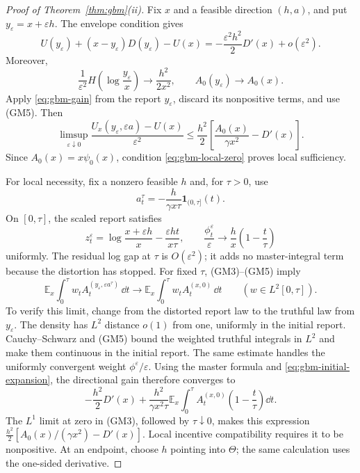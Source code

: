 \documentclass[12pt]{article}
\newcommand{\E}{\mathbb{E}}
\begin{document}
\begin{proof}[Proof of Theorem~\ref{thm:gbm}(ii)]
Fix \(x\) and a feasible direction \((h,a)\), and put
\(y_\varepsilon=x+\varepsilon h\). The envelope condition gives
\begin{equation}\label{eq:gbm-initial-expansion}
  U(y_\varepsilon)+(x-y_\varepsilon)D(y_\varepsilon)-U(x)
   =-\frac{\varepsilon^2h^2}{2}D'(x)+o(\varepsilon^2).
\end{equation}
Moreover,
\[
  \frac1{\varepsilon^2}H\!\left(\log\frac{y_\varepsilon}{x}\right)
    \longrightarrow\frac{h^2}{2x^2},
  \qquad A_0(y_\varepsilon)\longrightarrow A_0(x).
\]
Apply \eqref{eq:gbm-gain} from the report \(y_\varepsilon\), discard
its nonpositive terms, and use (GM5). Then
\begin{equation}\label{eq:gbm-local-bound}
  \limsup_{\varepsilon\downarrow0}
  \frac{U_x(y_\varepsilon,\varepsilon a)-U(x)}{\varepsilon^2}
  \leq\frac{h^2}{2}
       \left[\frac{A_0(x)}{\gamma x^2}-D'(x)\right].
\end{equation}
Since \(A_0(x)=x\psi_0(x)\), condition
\eqref{eq:gbm-local-zero} proves local sufficiency.

For local necessity, fix a nonzero feasible \(h\) and, for
\(\tau>0\), use
\[
  a_t^\tau=-\frac{h}{\gamma x\tau}\mathbf1_{(0,\tau]}(t).
\]
On \([0,\tau]\), the scaled report satisfies
\[
  z_t^\varepsilon
    =\log\frac{x+\varepsilon h}{x}
       -\frac{\varepsilon ht}{x\tau},
  \qquad
  \frac{\phi_t^\varepsilon}{\varepsilon}
    \longrightarrow\frac hx\left(1-\frac t\tau\right)
\]
uniformly. The residual log gap at \(\tau\) is
\(O(\varepsilon^2)\); it adds no master-integral term because the
distortion has stopped. For fixed \(\tau\), (GM3)--(GM5) imply
\[
  \E_x\int_0^\tau w_t A_t^{(y_\varepsilon,\varepsilon a^\tau)}\,\dd t
   \longrightarrow
  \E_x\int_0^\tau w_t A_t^{(x,0)}\,\dd t
  \qquad(w\in L^2[0,\tau]).
\]
To verify this limit, change from the distorted report law to the
truthful law from \(y_\varepsilon\). The density has \(L^2\)
distance \(o(1)\) from one, uniformly in the initial report.
Cauchy--Schwarz and (GM5) bound the weighted truthful integrals in
\(L^2\) and make them continuous in the initial report. The same
estimate handles the uniformly convergent weight
\(\phi^\varepsilon/\varepsilon\). Using the master formula and
\eqref{eq:gbm-initial-expansion}, the directional gain therefore
converges to
\[
  -\frac{h^2}{2}D'(x)
  +\frac{h^2}{\gamma x^2\tau}
       \E_x\int_0^\tau A_t^{(x,0)}
         \left(1-\frac t\tau\right)\dd t.
\]
The \(L^1\) limit at zero in (GM3), followed by
\(\tau\downarrow0\), makes this expression
\(\tfrac{h^2}{2}[A_0(x)/(\gamma x^2)-D'(x)]\). Local incentive
compatibility requires it to be nonpositive. At an endpoint, choose
\(h\) pointing into \(\Theta\); the same calculation uses the
one-sided derivative.


\end{proof}
\end{document}
